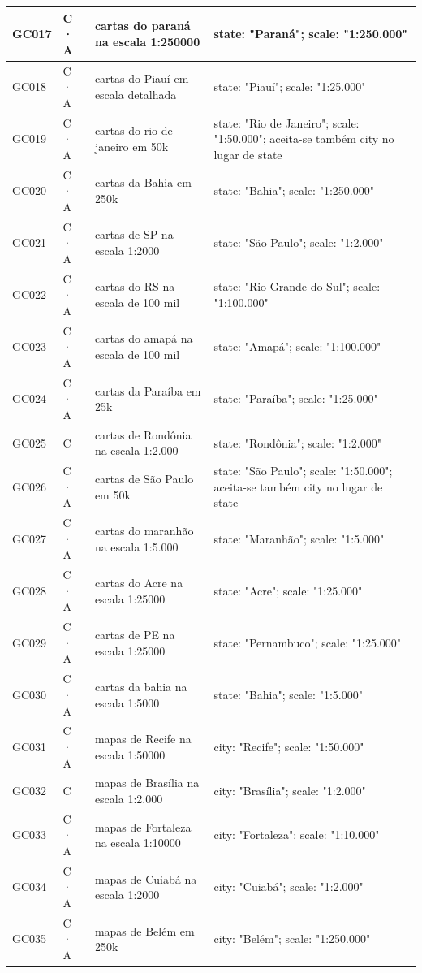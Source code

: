 {\begin{longtable}{|p{1.1cm}|p{1.3cm}|p{5.4cm}|p{6.3cm}|}
GC017 & C · A & cartas do paraná na escala 1:250000 & state: "Paraná"; scale: "1:250.000" \\ \hline
GC018 & C · A & cartas do Piauí em escala detalhada & state: "Piauí"; scale: "1:25.000" \\ \hline
GC019 & C · A & cartas do rio de janeiro em 50k & state: "Rio de Janeiro"; scale: "1:50.000"; aceita-se também city no lugar de state \\ \hline
GC020 & C · A & cartas da Bahia em 250k & state: "Bahia"; scale: "1:250.000" \\ \hline
GC021 & C · A & cartas de SP na escala 1:2000 & state: "São Paulo"; scale: "1:2.000" \\ \hline
GC022 & C · A & cartas do RS na escala de 100 mil & state: "Rio Grande do Sul"; scale: "1:100.000" \\ \hline
GC023 & C · A & cartas do amapá na escala de 100 mil & state: "Amapá"; scale: "1:100.000" \\ \hline
GC024 & C · A & cartas da Paraíba em 25k & state: "Paraíba"; scale: "1:25.000" \\ \hline
GC025 & C & cartas de Rondônia na escala 1:2.000 & state: "Rondônia"; scale: "1:2.000" \\ \hline
GC026 & C · A & cartas de São Paulo em 50k & state: "São Paulo"; scale: "1:50.000"; aceita-se também city no lugar de state \\ \hline
GC027 & C · A & cartas do maranhão na escala 1:5.000 & state: "Maranhão"; scale: "1:5.000" \\ \hline
GC028 & C · A & cartas do Acre na escala 1:25000 & state: "Acre"; scale: "1:25.000" \\ \hline
GC029 & C · A & cartas de PE na escala 1:25000 & state: "Pernambuco"; scale: "1:25.000" \\ \hline
GC030 & C · A & cartas da bahia na escala 1:5000 & state: "Bahia"; scale: "1:5.000" \\ \hline
GC031 & C · A & mapas de Recife na escala 1:50000 & city: "Recife"; scale: "1:50.000" \\ \hline
GC032 & C & mapas de Brasília na escala 1:2.000 & city: "Brasília"; scale: "1:2.000" \\ \hline
GC033 & C · A & mapas de Fortaleza na escala 1:10000 & city: "Fortaleza"; scale: "1:10.000" \\ \hline
GC034 & C · A & mapas de Cuiabá na escala 1:2000 & city: "Cuiabá"; scale: "1:2.000" \\ \hline
GC035 & C · A & mapas de Belém em 250k & city: "Belém"; scale: "1:250.000" \\ \hline

\end{longtable}}
